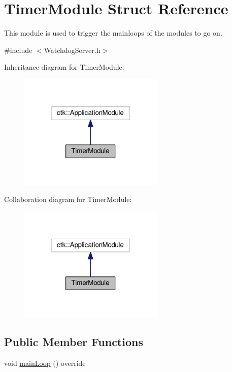 \hypertarget{structTimerModule}{}\section{Timer\+Module Struct Reference}
\label{structTimerModule}


This module is used to trigger the mainloops of the modules to go on.  




{\ttfamily \#include $<$Watchdog\+Server.\+h$>$}



Inheritance diagram for Timer\+Module\+:
\nopagebreak
\begin{figure}[H]
\begin{center}
\leavevmode
\includegraphics[width=196pt]{structTimerModule__inherit__graph}
\end{center}
\end{figure}


Collaboration diagram for Timer\+Module\+:
\nopagebreak
\begin{figure}[H]
\begin{center}
\leavevmode
\includegraphics[width=196pt]{structTimerModule__coll__graph}
\end{center}
\end{figure}
\subsection*{Public Member Functions}
\begin{DoxyCompactItemize}
\item 
void \hyperlink{structTimerModule_a2b66ac09a2bc900732fa7729ccace545}{main\+Loop} () override
\end{DoxyCompactItemize}
